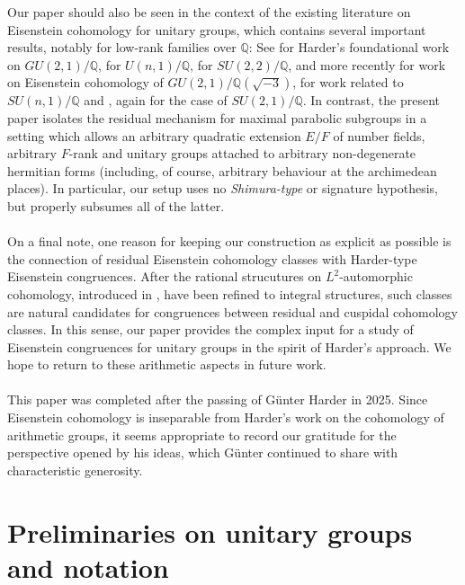 \documentclass[a4paper,10pt]{amsart}
\theoremstyle{definition}
\numberwithin{equation}{section}
\def\Q{\mathbb Q}
\begin{document}
Our paper should also be seen in the context of the existing literature on Eisenstein cohomology for unitary groups, which contains several important results, notably for low-rank families over \(\mathbb Q\): See \cite{harderGU} for Harder's foundational work on $GU(2,1)/\Q$, \cite{grabschwun} for \(U(n,1)/\mathbb Q\), \cite{hayataschwermer} for \(SU(2,2)/\mathbb Q\), and more recently \cite{Ber-vdG22} for work on Eisenstein cohomology of $GU(2,1)/\Q(\sqrt{-3})$,  \cite{nairrai} for work related to \(SU(n,1)/\mathbb Q\) and \cite{bajcav}, again for the case of $SU(2,1)/\Q$. In contrast, the present paper isolates the residual mechanism for maximal parabolic subgroups in a setting which allows an arbitrary quadratic extension \(E/F\) of number fields, arbitrary \(F\)-rank and unitary groups attached to arbitrary non-degenerate hermitian forms (including, of course, arbitrary behaviour at the archimedean places). In particular, our setup uses no {\it Shimura-type} or signature hypothesis, but properly subsumes all of the latter.\\\\
On a final note, one reason for keeping our construction as explicit as possible is the connection of residual Eisenstein cohomology classes with Harder-type Eisenstein congruences. After the rational strucutures on $L^2$-automorphic cohomology, introduced in \cite{nairrai}, have been refined to integral structures, such classes are natural candidates for congruences between residual and cuspidal cohomology classes. In this sense, our paper provides the complex input for a study of Eisenstein congruences for unitary groups in the spirit of Harder's approach. We hope to return to these arithmetic aspects in future work.\\\\
\small
{}\enlargethispage{1cm}
This paper was completed after the passing of G\"unter Harder in 2025. Since Eisenstein cohomology is inseparable from Harder's work on the cohomology of arithmetic groups, it seems appropriate to record our gratitude for the perspective opened by his ideas, which G\"unter continued to share with characteristic generosity.
\normalsize




\section{Preliminaries on unitary groups and notation}\label{sect:preliminaries}
\end{document}
